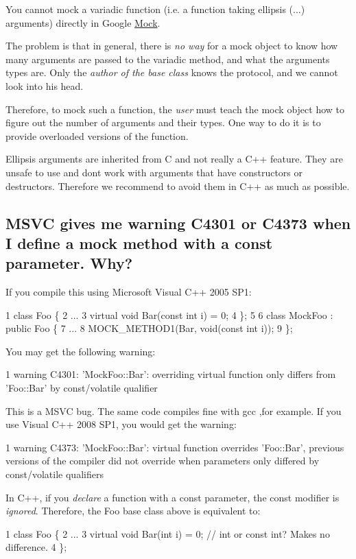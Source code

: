 You cannot mock a variadic function (i.\+e. a function taking ellipsis ({\ttfamily ...}) arguments) directly in Google \hyperlink{class_mock}{Mock}.

The problem is that in general, there is {\itshape no way} for a mock object to know how many arguments are passed to the variadic method, and what the arguments\textquotesingle{} types are. Only the {\itshape author of the base class} knows the protocol, and we cannot look into his head.

Therefore, to mock such a function, the {\itshape user} must teach the mock object how to figure out the number of arguments and their types. One way to do it is to provide overloaded versions of the function.

Ellipsis arguments are inherited from C and not really a C++ feature. They are unsafe to use and don\textquotesingle{}t work with arguments that have constructors or destructors. Therefore we recommend to avoid them in C++ as much as possible.

\subsection*{M\+S\+VC gives me warning C4301 or C4373 when I define a mock method with a const parameter. Why?}

If you compile this using Microsoft Visual C++ 2005 S\+P1\+: 
\begin{DoxyCode}
1 class Foo \{
2   ...
3   virtual void Bar(const int i) = 0;
4 \};
5 
6 class MockFoo : public Foo \{
7   ...
8   MOCK\_METHOD1(Bar, void(const int i));
9 \};
\end{DoxyCode}
 You may get the following warning\+: 
\begin{DoxyCode}
1 warning C4301: 'MockFoo::Bar': overriding virtual function only differs from 'Foo::Bar' by const/volatile
       qualifier
\end{DoxyCode}


This is a M\+S\+VC bug. The same code compiles fine with gcc ,for example. If you use Visual C++ 2008 S\+P1, you would get the warning\+: 
\begin{DoxyCode}
1 warning C4373: 'MockFoo::Bar': virtual function overrides 'Foo::Bar', previous versions of the compiler did
       not override when parameters only differed by const/volatile qualifiers
\end{DoxyCode}


In C++, if you {\itshape declare} a function with a {\ttfamily const} parameter, the {\ttfamily const} modifier is {\itshape ignored}. Therefore, the {\ttfamily Foo} base class above is equivalent to\+: 
\begin{DoxyCode}
1 class Foo \{
2   ...
3   virtual void Bar(int i) = 0;  // int or const int?  Makes no difference.
4 \};
\end{DoxyCode}


